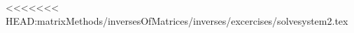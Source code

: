 \documentclass{ximera}
\begin{document}
<<<<<<< HEAD:matrixMethods/inversesOfMatrices/inverses/excercises/solvesystem2.tex
\end{document}
